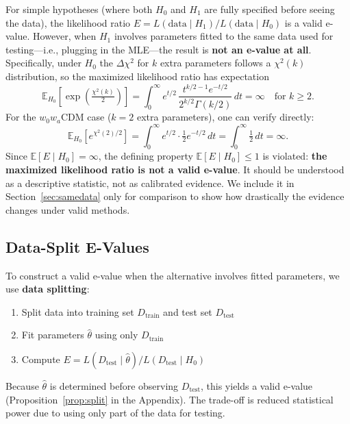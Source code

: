 \documentclass[11pt,a4paper]{article}
\newcommand{\E}{\mathbb{E}}
\begin{document}
For simple hypotheses (where both $H_0$ and $H_1$ are fully specified before seeing the data), the likelihood ratio $E = L(\text{data} \mid H_1) / L(\text{data} \mid H_0)$ is a valid e-value. However, when $H_1$ involves parameters fitted to the same data used for testing---i.e., plugging in the MLE---the result is \textbf{not an e-value at all}. Specifically, under $H_0$ the $\Delta\chi^2$ for $k$ extra parameters follows a $\chi^2(k)$ distribution, so the maximized likelihood ratio has expectation
\begin{equation}
\E_{H_0}\!\left[\exp\!\left(\tfrac{\chi^2(k)}{2}\right)\right] = \int_0^\infty e^{t/2}\,\frac{t^{k/2-1}e^{-t/2}}{2^{k/2}\Gamma(k/2)}\,dt = \infty \quad \text{for } k \geq 2.
\end{equation}
For the $w_0w_a$CDM case ($k=2$ extra parameters), one can verify directly:
\begin{equation}
\E_{H_0}\!\left[e^{\chi^2(2)/2}\right] = \int_0^\infty e^{t/2}\cdot\tfrac{1}{2}e^{-t/2}\,dt = \int_0^\infty \tfrac{1}{2}\,dt = \infty.
\end{equation}
Since $\E[E \mid H_0] = \infty$, the defining property $\E[E \mid H_0] \leq 1$ is violated: \textbf{the maximized likelihood ratio is not a valid e-value}. It should be understood as a descriptive statistic, not as calibrated evidence. We include it in Section~\ref{sec:samedata} only for comparison to show how drastically the evidence changes under valid methods.

\subsection{Data-Split E-Values}

To construct a valid e-value when the alternative involves fitted parameters, we use \textbf{data splitting}:
\begin{enumerate}
    \item Split data into training set $D_{\text{train}}$ and test set $D_{\text{test}}$
    \item Fit parameters $\hat{\theta}$ using only $D_{\text{train}}$
    \item Compute $E = L(D_{\text{test}} \mid \hat{\theta}) / L(D_{\text{test}} \mid H_0)$
\end{enumerate}

Because $\hat{\theta}$ is determined before observing $D_{\text{test}}$, this yields a valid e-value (Proposition~\ref{prop:split} in the Appendix). The trade-off is reduced statistical power due to using only part of the data for testing.
\end{document}
